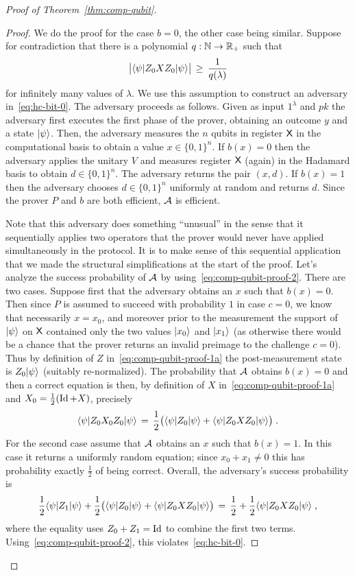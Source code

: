 \begin{proof}[Proof of Theorem~\ref{thm:comp-qubit}]
\begin{proof}
We do the proof for the case $b=0$, the other case being similar. Suppose for contradiction that there is a polynomial $q:\mathbb{N}\to\mathbb{R}_+$ such that 
\begin{equation}\label{eq:comp-qubit-proof-2}
\big| \langle\psi| Z_0 X Z_0 |\psi\rangle \big| \,\geq\, \frac{1}{q(\lambda)}
\end{equation} 
for infinitely many values of $\lambda$. We use this assumption to construct an adversary in~\eqref{eq:hc-bit-0}. The adversary proceeds as follows. Given as input $1^\lambda$ and $pk$ the adversary first executes the first phase of the prover, obtaining an outcome $y$ and a state $|\psi\rangle$. Then, the adversary measures the $n$ qubits in register ${\textsf{X}}$ in the computational basis to obtain a value $x\in \{0,1\}^n$. If $b(x)=0$ then the adversary applies the unitary $V$ and measures register ${\textsf{X}}$ (again) in the Hadamard basis to obtain $d\in \{0,1\}^n$. The adversary returns the pair $(x,d)$. If $b(x)=1$ then the adversary chooses $d\in\{0,1\}^n$ uniformly at random and returns $d$. Since the prover $P$ and $b$ are both efficient, $\mathcal{A}$ is efficient. 

Note that this adversary does something ``unusual'' in the sense that it sequentially applies two operators that the prover would  never have applied simultaneously in the protocol. It is to make sense of this sequential application that we made the structural simplifications at the start of the proof. Let's analyze the success probability of $\mathcal{A}$ by using~\eqref{eq:comp-qubit-proof-2}. There are two cases. Suppose first that the adversary obtains an $x$ such that $b(x)=0$. Then since $P$ is assumed to succeed with probability $1$ in case $c=0$, we know that necessarily $x=x_0$, and moreover prior to the measurement the support of $|\psi\rangle$ on ${\textsf{X}}$ contained only the two values $|x_0\rangle$ and $|x_1\rangle$ (as otherwise there would be a chance that the prover returns an invalid preimage to the challenge $c=0$). Thus by definition of $Z$ in~\eqref{eq:comp-qubit-proof-1a} the post-measurement state is $Z_0|\psi\rangle$ (suitably re-normalized). The probability that $\mathcal{A}$ obtains $b(x)=0$ and then a correct equation is then, by definition of $X$ in~\eqref{eq:comp-qubit-proof-1a} and $X_0 = \frac{1}{2}(\mathop{\rm Id}\nolimits + X)$, precisely 
\[ \langle\psi| Z_0 X_0 Z_0 |\psi\rangle \,=\, \frac{1}{2} \big( \langle\psi|Z_0|\psi\rangle + \langle\psi| Z_0 X Z_0 |\psi\rangle \big) \;.\]
For the second case assume that $\mathcal{A}$ obtains an $x$ such that $b(x)=1$. In this case it returns a uniformly random equation; since $x_0+ x_1\neq 0$ this has probability exactly $\frac{1}{2}$ of being correct. Overall, the adversary's success probability is 
\[ \frac{1}{2}\langle\psi|Z_1|\psi\rangle +  \frac{1}{2}\big( \langle\psi|Z_0|\psi\rangle + \langle\psi| Z_0 X Z_0 |\psi\rangle \big) \,=\, \frac{1}{2} + \frac{1}{2}\langle\psi| Z_0 X Z_0 |\psi\rangle\;,\]
where the equality uses $Z_0+Z_1=\mathop{\rm Id}\nolimits$ to combine the first two terms. Using~\eqref{eq:comp-qubit-proof-2}, this violates~\eqref{eq:hc-bit-0}. 
\end{proof}



\end{proof}
